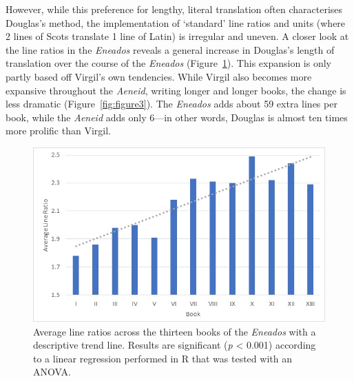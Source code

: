 \documentclass{dhbenelux}
\begin{document}
However, while this preference for lengthy, literal translation often
characterises Douglas's method, the implementation of `standard' line
ratios and units (where 2 lines of Scots translate 1 line of Latin) is
irregular and uneven. A closer look at the line ratios in the
\emph{Eneados} reveals a general increase in Douglas's length of
translation over the course of the \emph{Eneados} (Figure~\ref{fig:figure2}). This
expansion is only partly based off Virgil's own tendencies. While Virgil
also becomes more expansive throughout the \emph{Aeneid}, writing longer
and longer books, the change is less dramatic (Figure~\ref{fig:figure3}). The
\emph{Eneados} adds about 59 extra lines per book, while the
\emph{Aeneid} adds only 6---in other words, Douglas is almost ten times
more prolific than Virgil.

\begin{figure}[H]
\begin{center}
\includegraphics[width=1\linewidth]{Images/Figure2.jpg}
\end{center}
\caption{Average line ratios across the thirteen books of the \emph{Eneados} with a descriptive trend line.  Results are significant (\emph{p} < 0.001) according to a linear regression performed in R that was tested with an ANOVA.}
\label{fig:figure2}
\end{figure}
\end{document}

